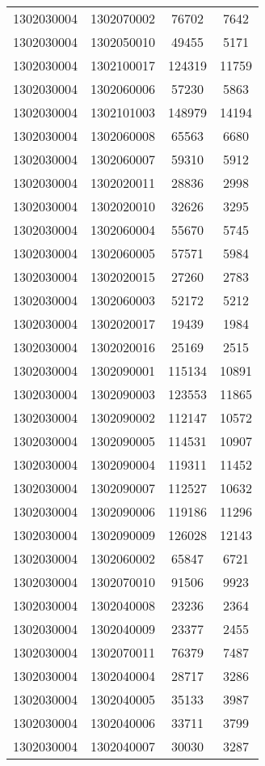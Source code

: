 \begin{longtable}{llcc}
1302030004 & 1302070002 & 76702 & 7642\\
1302030004 & 1302050010 & 49455 & 5171\\
1302030004 & 1302100017 & 124319 & 11759\\
1302030004 & 1302060006 & 57230 & 5863\\
1302030004 & 1302101003 & 148979 & 14194\\
1302030004 & 1302060008 & 65563 & 6680\\
1302030004 & 1302060007 & 59310 & 5912\\
1302030004 & 1302020011 & 28836 & 2998\\
1302030004 & 1302020010 & 32626 & 3295\\
1302030004 & 1302060004 & 55670 & 5745\\
1302030004 & 1302060005 & 57571 & 5984\\
1302030004 & 1302020015 & 27260 & 2783\\
1302030004 & 1302060003 & 52172 & 5212\\
1302030004 & 1302020017 & 19439 & 1984\\
1302030004 & 1302020016 & 25169 & 2515\\
1302030004 & 1302090001 & 115134 & 10891\\
1302030004 & 1302090003 & 123553 & 11865\\
1302030004 & 1302090002 & 112147 & 10572\\
1302030004 & 1302090005 & 114531 & 10907\\
1302030004 & 1302090004 & 119311 & 11452\\
1302030004 & 1302090007 & 112527 & 10632\\
1302030004 & 1302090006 & 119186 & 11296\\
1302030004 & 1302090009 & 126028 & 12143\\
1302030004 & 1302060002 & 65847 & 6721\\
1302030004 & 1302070010 & 91506 & 9923\\
1302030004 & 1302040008 & 23236 & 2364\\
1302030004 & 1302040009 & 23377 & 2455\\
1302030004 & 1302070011 & 76379 & 7487\\
1302030004 & 1302040004 & 28717 & 3286\\
1302030004 & 1302040005 & 35133 & 3987\\
1302030004 & 1302040006 & 33711 & 3799\\
1302030004 & 1302040007 & 30030 & 3287\\

\end{longtable}
